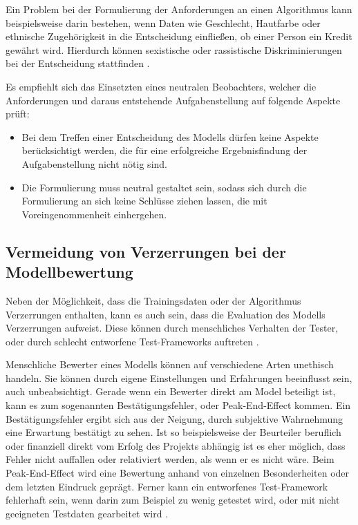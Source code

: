 \documentclass[12pt]{report}
\begin{document}
Ein Problem bei der Formulierung der Anforderungen an einen Algorithmus kann beispielsweise darin bestehen, wenn Daten wie Geschlecht, Hautfarbe oder ethnische Zugehörigkeit in die Entscheidung einfließen, ob einer Person ein Kredit gewährt wird. Hierdurch können sexistische oder rassistische Diskriminierungen bei der Entscheidung stattfinden \cite[S. 51f.]{Srinivasan}.

Es empfiehlt sich das Einsetzten eines neutralen Beobachters, welcher die Anforderungen und daraus entstehende Aufgabenstellung auf folgende Aspekte prüft: %
\begin{itemize}
    \item Bei dem Treffen einer Entscheidung des Modells dürfen keine Aspekte berücksichtigt werden, die für eine erfolgreiche Ergebnisfindung der Aufgabenstellung nicht nötig sind.
    \item Die Formulierung muss neutral gestaltet sein, sodass sich durch die Formulierung an sich keine Schlüsse ziehen lassen, die mit Voreingenommenheit einhergehen.
\end{itemize}

\subsection{Vermeidung von Verzerrungen bei der Modellbewertung}
Neben der Möglichkeit, dass die Trainingsdaten oder der Algorithmus Verzerrungen enthalten, kann es auch sein, dass die Evaluation des Modells Verzerrungen aufweist.
Diese können durch menschliches Verhalten der Tester, oder durch schlecht entworfene Test-Frameworks auftreten \cite[S. 54f.]{Srinivasan}.

Menschliche Bewerter eines Modells können auf verschiedene Arten unethisch handeln. Sie können durch eigene Einstellungen und Erfahrungen beeinflusst sein, auch unbeabsichtigt.
Gerade wenn ein Bewerter direkt am Model beteiligt ist, kann es zum sogenannten Bestätigungsfehler, oder \glqq Peak-End-Effect\grqq{} kommen. Ein Bestätigungsfehler ergibt sich aus der Neigung, durch subjektive Wahrnehmung eine Erwartung bestätigt zu sehen. Ist so beispielsweise der Beurteiler beruflich oder finanziell direkt vom Erfolg des Projekts abhängig ist es eher möglich, dass Fehler nicht auffallen oder relativiert werden, als wenn er es nicht wäre.
Beim \glqq Peak-End-Effect\grqq{} wird eine Bewertung anhand von einzelnen Besonderheiten oder dem letzten Eindruck geprägt.
Ferner kann ein entworfenes Test-Framework fehlerhaft sein, wenn darin zum Beispiel zu wenig getestet wird, oder mit nicht geeigneten Testdaten gearbeitet wird \cite[S. 54f.]{Srinivasan}.
\end{document}
